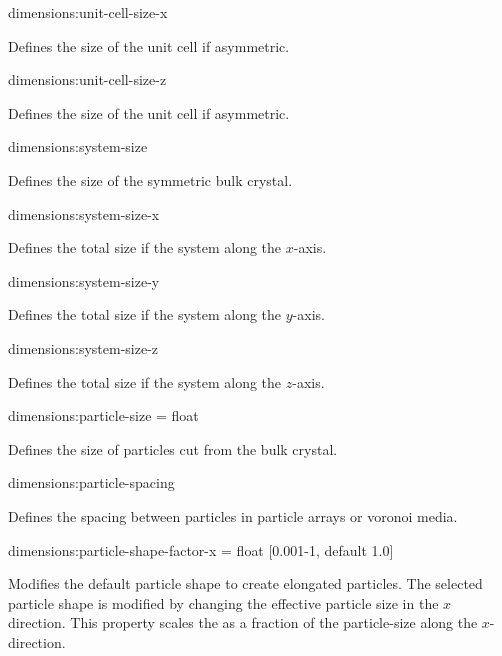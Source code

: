 {\zicf dimensions:unit-cell-size-x}
 Defines the size
of the unit cell if asymmetric.\\ \par

{\zicf dimensions:unit-cell-size-z}
 Defines the size
of the unit cell if asymmetric.\\ \par

{\zicf dimensions:system-size}
 Defines the size of
the symmetric bulk crystal. \\ \par

{\zicf dimensions:system-size-x}
 Defines the total
size if the system along the $x$-axis.\\ \par

{\zicf dimensions:system-size-y}
 Defines the total
size if the system along the $y$-axis.\\ \par

{\zicf dimensions:system-size-z}
 Defines the total
size if the system along the $z$-axis.\\ \par

{\zicf dimensions:particle-size = float}
 Defines the size of
particles cut from the bulk crystal.\\ \par

{\zicf dimensions:particle-spacing}
Defines the spacing between particles in particle arrays or voronoi media.\\ \par


{\zicf dimensions:particle-shape-factor-x = float [0.001-1, default 1.0]}
Modifies the default particle shape to create elongated particles. The selected
particle shape is modified by changing the effective particle size in the $x$
direction. This property scales the as a fraction of the particle-size along the
$x$-direction.\\

